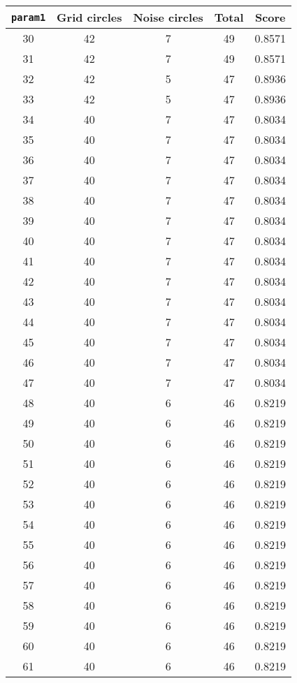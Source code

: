 \documentclass[letterpaper, 12pt]{article}
\begin{document}
\begin{longtable}{|c|c|c|c|c|}
\hline
\textbf{\texttt{param1}} & \textbf{Grid circles} & \textbf{Noise circles} & \textbf{Total} & \textbf{Score} \\
\hline
30 & 42 & 7 & 49 & 0.8571 \\
\hline
31 & 42 & 7 & 49 & 0.8571 \\
\hline
32 & 42 & 5 & 47 & 0.8936 \\
\hline
33 & 42 & 5 & 47 & 0.8936 \\
\hline
34 & 40 & 7 & 47 & 0.8034 \\
\hline
35 & 40 & 7 & 47 & 0.8034 \\
\hline
36 & 40 & 7 & 47 & 0.8034 \\
\hline
37 & 40 & 7 & 47 & 0.8034 \\
\hline
38 & 40 & 7 & 47 & 0.8034 \\
\hline
39 & 40 & 7 & 47 & 0.8034 \\
\hline
40 & 40 & 7 & 47 & 0.8034 \\
\hline
41 & 40 & 7 & 47 & 0.8034 \\
\hline
42 & 40 & 7 & 47 & 0.8034 \\
\hline
43 & 40 & 7 & 47 & 0.8034 \\
\hline
44 & 40 & 7 & 47 & 0.8034 \\
\hline
45 & 40 & 7 & 47 & 0.8034 \\
\hline
46 & 40 & 7 & 47 & 0.8034 \\
\hline
47 & 40 & 7 & 47 & 0.8034 \\
\hline
48 & 40 & 6 & 46 & 0.8219 \\
\hline
49 & 40 & 6 & 46 & 0.8219 \\
\hline
50 & 40 & 6 & 46 & 0.8219 \\
\hline
51 & 40 & 6 & 46 & 0.8219 \\
\hline
52 & 40 & 6 & 46 & 0.8219 \\
\hline
53 & 40 & 6 & 46 & 0.8219 \\
\hline
54 & 40 & 6 & 46 & 0.8219 \\
\hline
55 & 40 & 6 & 46 & 0.8219 \\
\hline
56 & 40 & 6 & 46 & 0.8219 \\
\hline
57 & 40 & 6 & 46 & 0.8219 \\
\hline
58 & 40 & 6 & 46 & 0.8219 \\
\hline
59 & 40 & 6 & 46 & 0.8219 \\
\hline
60 & 40 & 6 & 46 & 0.8219 \\
\hline
61 & 40 & 6 & 46 & 0.8219 \\

\end{longtable}
\end{document}
